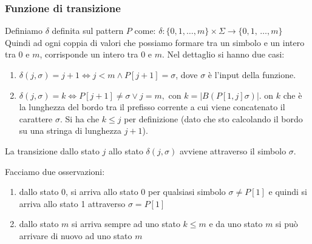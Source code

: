 \subsubsection{Funzione di transizione}
Definiamo $\delta$ definita sul pattern $P$ come: $\delta:\{0,1,\ldots, m\}\times \Sigma\to\{0,1,\,\ldots, m\}$  \\
Quindi ad ogni coppia di valori che possiamo formare tra un simbolo e un intero tra 0 e $m$, corrisponde un intero tra 0 e $m$. Nel dettaglio si hanno due casi:
\begin{enumerate}
    \item $\delta(j,\sigma) = j + 1 \iff j < m \land P[j + 1]= \sigma$, dove $\sigma$ è l'input della funzione.
    \item $\delta(j,\sigma) = k \iff P[j + 1]\neq \sigma \lor j = m,\mbox{ con } k = |B(P[1, j] \sigma)|$. 
    on $k$ che è la lunghezza del bordo tra il prefisso corrente a cui viene concatenato il carattere $\sigma$. Si ha che $k\leq j$ per definizione (dato che sto calcolando il bordo su una stringa di lunghezza $j+1$).  
\end{enumerate}
La transizione dallo stato $j$ allo stato $\delta(j,\sigma)$ avviene attraverso il simbolo $\sigma$. 


Facciamo due osservazioni:
\begin{enumerate}
    \item dallo stato 0, si arriva allo stato 0 per qualsiasi simbolo $\sigma\neq P[1]$ e quindi si arriva allo stato 1 attraverso $\sigma =P[1]$ 
    \item dallo stato $m$ si arriva sempre ad uno stato $k\leq m$ e da uno stato $m$ si può arrivare di nuovo ad uno stato $m$
\end{enumerate}


